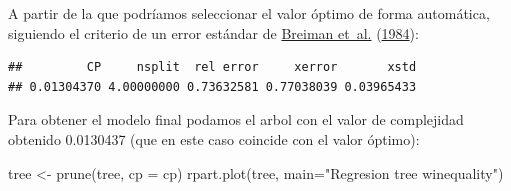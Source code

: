 \documentclass[
  spanish,
]{book}
\newenvironment{Shaded}{\begin{snugshade}}{\end{snugshade}}
\newcommand{\AttributeTok}[1]{\textcolor[rgb]{0.77,0.63,0.00}{#1}}
\newcommand{\CommentTok}[1]{\textcolor[rgb]{0.56,0.35,0.01}{\textit{#1}}}
\newcommand{\FunctionTok}[1]{\textcolor[rgb]{0.00,0.00,0.00}{#1}}
\newcommand{\NormalTok}[1]{#1}
\newcommand{\OtherTok}[1]{\textcolor[rgb]{0.56,0.35,0.01}{#1}}
\newcommand{\SpecialCharTok}[1]{\textcolor[rgb]{0.00,0.00,0.00}{#1}}
\newcommand{\StringTok}[1]{\textcolor[rgb]{0.31,0.60,0.02}{#1}}
\theoremstyle{break}
\theoremstyle{definition}
\theoremstyle{definition}
\theoremstyle{definition}
\theoremstyle{definition}
\theoremstyle{remark}
\begin{document}
A partir de la que podríamos seleccionar el valor óptimo de forma automática,
siguiendo el criterio de un error estándar de \protect\hyperlink{ref-breiman1984classification}{Breiman et~al.} (\protect\hyperlink{ref-breiman1984classification}{1984}):

\begin{Shaded}
\end{Shaded}

\begin{verbatim}
##         CP     nsplit  rel error     xerror       xstd 
## 0.01304370 4.00000000 0.73632581 0.77038039 0.03965433
\end{verbatim}

\begin{Shaded}
\end{Shaded}

Para obtener el modelo final podamos el arbol con el valor de complejidad obtenido 0.0130437 (que en este caso coincide con el valor óptimo):

\begin{Shaded}
\begin{Highlighting}[]
\NormalTok{tree }\OtherTok{\textless{}{-}} \FunctionTok{prune}\NormalTok{(tree, }\AttributeTok{cp =}\NormalTok{ cp)}
\FunctionTok{rpart.plot}\NormalTok{(tree, }\AttributeTok{main=}\StringTok{"Regresion tree winequality"}\NormalTok{) }
\end{Highlighting}
\end{Shaded}
\end{document}
